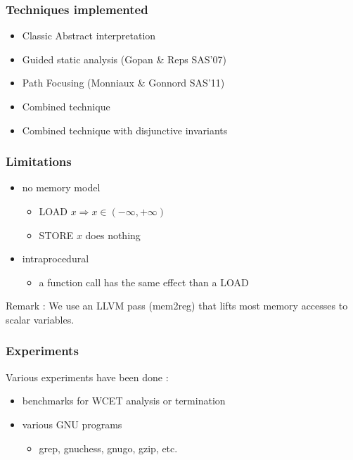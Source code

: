 \documentclass{beamer}
\begin{document}
\begin{frame}
	\frametitle{Techniques implemented}

	\begin{itemize}
		\item Classic Abstract interpretation
		\item Guided static analysis (Gopan \& Reps SAS'07)
		\item Path Focusing (Monniaux \& Gonnord SAS'11)
		\item Combined technique
		\item Combined technique with disjunctive invariants
	\end{itemize}

\end{frame}

\begin{frame}
	\frametitle{Limitations}

	\begin{itemize}
		\item no memory model
			\begin{itemize}
				\item LOAD $x \Rightarrow x \in (-\infty,+\infty)$   
				\item STORE $x$ does nothing 
			\end{itemize}
		\item intraprocedural
			\begin{itemize}
				\item a function call has the same effect than a LOAD
			\end{itemize}
	\end{itemize}

	\vspace{1cm}
	
	Remark : We use an LLVM pass (mem2reg) that 
	lifts most memory accesses to scalar variables.
\end{frame}

\begin{frame}
	\frametitle{Experiments}

	Various experiments have been done :

	\begin{itemize}
		\item benchmarks for WCET analysis or termination
		\item various GNU programs 
			\begin{itemize}
				\item grep, gnuchess, gnugo, gzip, etc.
			\end{itemize}
	\end{itemize}
\end{frame}
\end{document}
